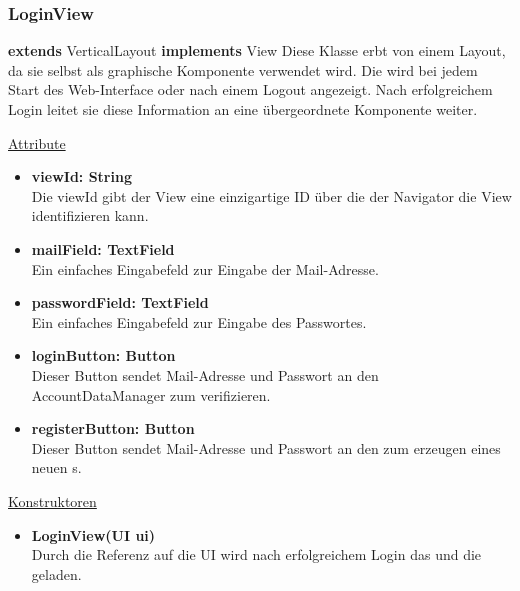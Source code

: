 \newpage
\subsubsection{LoginView}\label{LoginView}
\textbf{extends}  VerticalLayout \newline
\textbf{implements} View \newline
Diese Klasse erbt von einem Layout, da sie selbst als graphische Komponente verwendet wird. Die  wird bei jedem Start des Web-Interface oder nach einem Logout angezeigt. Nach erfolgreichem Login leitet sie diese Information an eine übergeordnete Komponente weiter.
\newline

\underline{Attribute}
\begin{itemize}
\itemsep0pt
\item \textbf{viewId: String} \hfill\\ 
Die viewId gibt der View eine einzigartige ID über die der Navigator die View identifizieren kann.

\item \textbf{mailField: TextField} \hfill\\ 
Ein einfaches Eingabefeld zur Eingabe der Mail-Adresse.

\item \textbf{passwordField: TextField} \hfill\\
Ein einfaches Eingabefeld zur Eingabe des Passwortes.

\item \textbf{loginButton: Button} \hfill\\
Dieser Button sendet Mail-Adresse und Passwort an den AccountDataManager zum verifizieren.

\item \textbf{registerButton: Button} \hfill\\
Dieser Button sendet Mail-Adresse und Passwort an den  zum erzeugen eines neuen s.

\end{itemize}

\underline{Konstruktoren}
\begin{itemize}
\itemsep0pt
\item \textbf{LoginView(UI ui)} \hfill\\
Durch die Referenz auf die UI wird nach erfolgreichem Login das  und die  geladen.
\end{itemize}

